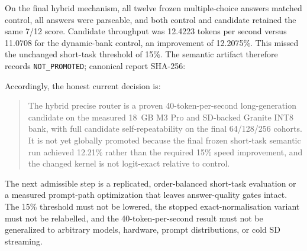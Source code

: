 On the final hybrid mechanism, all twelve frozen multiple-choice answers matched
control, all answers were parseable, and both control and candidate retained the
same 7/12 score.  Candidate throughput was 12.4223 tokens per second versus
11.0708 for the dynamic-bank control, an improvement of 12.2075\%.  This missed
the unchanged short-task threshold of 15\%.  The semantic artifact therefore
records \texttt{NOT\_PROMOTED}; canonical report SHA-256:

Accordingly, the honest current decision is:
\begin{quote}
The hybrid precise router is a proven 40-token-per-second long-generation
candidate on the measured 18~GB M3 Pro and SD-backed Granite INT8 bank, with
full candidate self-repeatability on the final 64/128/256 cohorts.  It is not
yet globally promoted because the final frozen short-task semantic run achieved
12.21\% rather than the required 15\% speed improvement, and the changed kernel
is not logit-exact relative to control.
\end{quote}

The next admissible step is a replicated, order-balanced short-task evaluation
or a measured prompt-path optimization that leaves answer-quality gates intact.
The 15\% threshold must not be lowered, the stopped exact-normalisation variant
must not be relabelled, and the 40-token-per-second result must not be generalized
to arbitrary models, hardware, prompt distributions, or cold SD streaming.
